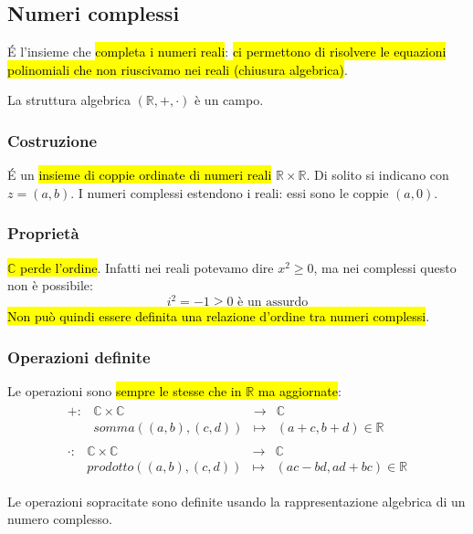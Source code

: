 \subsection{Numeri complessi}
\'E l'insieme che \hl{completa i numeri reali}: \hl{ci permettono di risolvere le
equazioni polinomiali che non riuscivamo nei reali (chiusura algebrica)}. 

La struttura algebrica $(\mathbb{R}, +, \cdot)$ è un campo.

\subsubsection{Costruzione}
\'E un \hl{insieme di coppie ordinate di numeri reali} 
$\mathbb{R} \times \mathbb{R}$. Di solito si indicano con $z = (a,b)$. I numeri 
complessi estendono i reali: essi sono le coppie $(a,0)$.

\subsubsection{Proprietà}
\hl{$\mathbb{C}$ perde l'ordine}. Infatti nei reali potevamo dire $x^2 \geq 0$,
ma nei complessi questo non è possibile: 
\[ i^2 = -1 \geq 0 \text{ è un assurdo}\] 
\hl{Non può quindi essere definita una relazione d'ordine tra numeri complessi}.

\subsubsection{Operazioni definite}
Le operazioni sono \hl{sempre le stesse che in $\mathbb{R}$ ma aggiornate}:
\begin{align*}
    \begin{array}{cccc}
        +: &\mathbb{C} \times \mathbb{C} &\to &\mathbb{C} \\
        &somma((a,b), (c,d)) &\mapsto & (a+c, b+d) \in \mathbb{R}
    \end{array} \\
    \begin{array}{cccc}
        \cdot: &\mathbb{C} \times \mathbb{C} &\to &\mathbb{C} \\
        &prodotto((a,b), (c,d)) &\mapsto & (ac-bd, ad + bc) \in \mathbb{R}
    \end{array}
\end{align*} 

Le operazioni sopracitate sono definite usando la rappresentazione algebrica di
un numero complesso.

